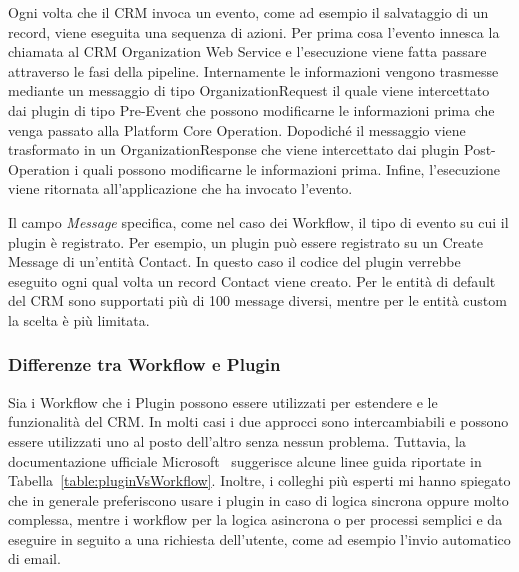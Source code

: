 Ogni volta che il CRM invoca un evento, come ad esempio il salvataggio di un record, viene eseguita una sequenza di azioni.
Per prima cosa l'evento innesca la chiamata al CRM Organization Web Service e l'esecuzione viene fatta passare attraverso le fasi della pipeline. Internamente le informazioni vengono trasmesse mediante un messaggio di tipo OrganizationRequest il quale viene intercettato dai plugin di tipo Pre-Event che possono modificarne le informazioni prima che venga passato alla Platform Core Operation. Dopodiché il messaggio viene trasformato in un OrganizationResponse che viene intercettato dai plugin Post-Operation i quali possono modificarne le informazioni prima.
Infine, l'esecuzione viene ritornata all'applicazione che ha invocato l'evento.

Il campo \textit{Message} specifica, come nel caso dei Workflow, il tipo di evento su cui il plugin è registrato. Per esempio, un plugin può essere registrato su un Create Message di un'entità Contact. In questo caso il codice del plugin verrebbe eseguito ogni qual volta un record Contact viene creato. Per le entità di default del CRM sono supportati più di 100 message diversi, mentre per le entità custom la scelta è più limitata.

\subsubsection{Differenze tra Workflow e Plugin}
Sia i Workflow che i Plugin possono essere utilizzati per estendere e le funzionalità del CRM. In molti casi i due approcci sono intercambiabili e possono essere utilizzati uno al posto dell'altro senza nessun problema. 
Tuttavia, la documentazione ufficiale Microsoft~\cite{PluginVSWorkflow} suggerisce alcune linee guida riportate in Tabella~\ref{table:pluginVsWorkflow}. Inoltre, i colleghi più esperti mi hanno spiegato che in generale preferiscono usare i plugin in caso di logica sincrona oppure molto complessa, mentre i workflow per la logica asincrona o per processi semplici e da eseguire in seguito a una richiesta dell'utente, come ad esempio l'invio automatico di email.


